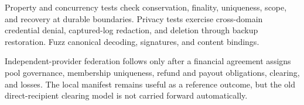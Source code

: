 \documentclass[11pt]{article}
\begin{document}
Property and concurrency tests check conservation, finality, uniqueness, scope,
and recovery at durable boundaries. Privacy tests exercise cross-domain credential
denial, captured-log redaction, and deletion through backup restoration. Fuzz
canonical decoding, signatures, and content bindings.

Independent-provider federation follows only after a financial agreement assigns
pool governance, membership uniqueness, refund and payout obligations, clearing,
and losses. The local manifest remains useful as a reference outcome, but the
old direct-recipient clearing model is not carried forward automatically.
\end{document}

